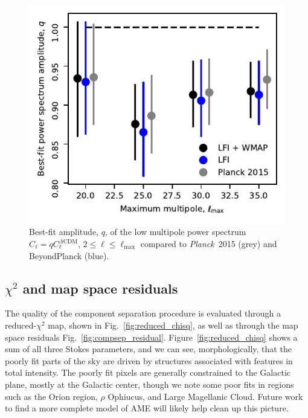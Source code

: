 \documentclass[twocolumn]{../../common/aa}
\def\planck{\emph{Planck}}
\begin{document}
\begin{figure}
	\includegraphics[width=\columnwidth]{figures/WMAP_best_q_fit.pdf}
	\caption{Best-fit amplitude, $q$, of the low multipole power spectrum $C_{\ell} = q C^{\Lambda \mathrm{CDM}}_{\ell}$, $2 \leq \ell \leq \ell_{\mathrm{max}}$ compared to \planck\ 2015 (grey) and BeyondPlanck (blue).}
\end{figure}



\subsection{$\chi^2$ and map space residuals}\label{subsub:compsep_chisq}

The quality of the component separation procedure is evaluated through a reduced-$\chi^2$   map, shown in Fig.~\ref{fig:reduced_chisq}, as well as through the map space residuals Fig.~\ref{fig:compsep_residual}. Figure~\ref{fig:reduced_chisq} shows a sum of all three Stokes parameters, and we can see, morphologically, that the poorly fit parts of the sky are driven by structures associated with features in total intensity. The poorly fit pixels are generally constrained to the Galactic plane, mostly at the Galactic center, though we note some poor fits in regions such as the Orion region, $\rho$ Ophiucus, and Large Magellanic Cloud. Future work to find a more complete model of AME will likely help clean up this picture.
\end{document}

